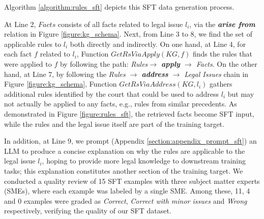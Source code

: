 Algorithm \ref{algorithm:rules_sft} depicts this SFT data generation process.
\begin{algorithm}[ht]
\caption{GenSFT($KG, l_{i}, LLM$), $KG$ represents the IRAC KG; $l_{i}$ denotes a legal issue in $KG$; a large language model $LLM$ produces an explanation on the applicability of certain rule(s) to $l_{i}$.}
\label{algorithm:rules_sft}

\begin{algorithmic}[1]
\EndFor
{}
\end{algorithmic}
\end{algorithm}
At Line 2, $Facts$ consists of all facts related to legal issue $l_{i}$, via the \textit{\textbf{arise from}} relation in Figure \ref{figure:kg_schema}. Next, from Line 3 to 8, we find the set of applicable rules to $l_{i}$ both directly and indirectly. On one hand, at Line 4, for each fact $f$ related to $l_{i}$, Function $GetRsViaApply(KG, f)$ finds the rules that were applied to $f$ by following the path: \textit{Rules$ \rightarrow$ \textbf{apply} $\rightarrow$ Facts}. On the other hand, at Line 7, by following the \textit{Rules $\rightarrow$ \textbf{address} $\rightarrow$ Legal Issues} chain in Figure \ref{figure:kg_schema}, Function $GetRsViaAddress(KG, l_{i})$ gathers additional rules identified by the court that could be used to address $l_{i}$ but may not actually be applied to any facts, e.g., rules from similar precedents.
As demonstrated in Figure \ref{figure:rules_sft}, the retrieved facts become SFT input, while the rules and the legal issue itself are part of the training target.

In addition, at Line 9, we prompt (Appendix \ref{section:appendix_prompt_sft}) an LLM to produce a concise explanation on why the rules are applicable to the legal issue $l_{i}$, hoping to provide more legal knowledge to downstream training tasks; this explanation constitutes another section of the training target. We conducted a quality review of 15 SFT examples with three subject matter experts (SMEs), where each example was labeled by a single SME. Among these, 11, 4 and 0 examples were graded as \textit{Correct}, \textit{Correct with minor issues} and \textit{Wrong} respectively, verifying the quality of our SFT dataset.

